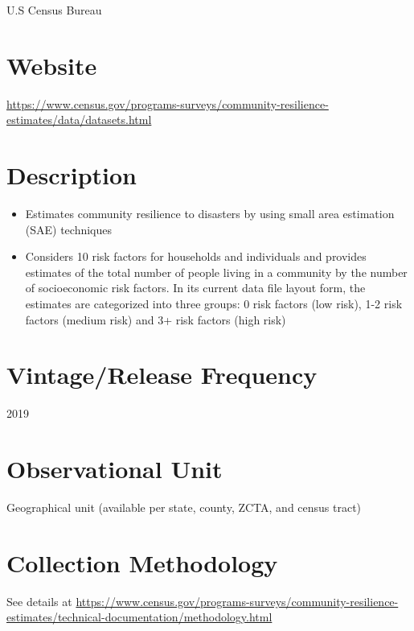 \documentclass[
]{book}
\providecommand{\tightlist}{%
  \setlength{\itemsep}{0pt}\setlength{\parskip}{0pt}}
\begin{document}
U.S Census Bureau

\hypertarget{website-17}{%
\section{Website}\label{website-17}}

\url{https://www.census.gov/programs-surveys/community-resilience-estimates/data/datasets.html}

\hypertarget{description-17}{%
\section{Description}\label{description-17}}

\begin{itemize}
\tightlist
\item
  Estimates community resilience to disasters by using small area estimation (SAE) techniques
\item
  Considers 10 risk factors for households and individuals and provides estimates of the total number of people living in a community by the number of socioeconomic risk factors. In its current data file layout form, the estimates are categorized into three
  groups: 0 risk factors (low risk), 1-2 risk factors (medium risk) and 3+ risk factors (high risk)
\end{itemize}

\hypertarget{vintagerelease-frequency-17}{%
\section{Vintage/Release Frequency}\label{vintagerelease-frequency-17}}

2019

\hypertarget{observational-unit-17}{%
\section{Observational Unit}\label{observational-unit-17}}

Geographical unit (available per state, county, ZCTA, and census tract)

\hypertarget{collection-methodology-17}{%
\section{Collection Methodology}\label{collection-methodology-17}}

See details at \url{https://www.census.gov/programs-surveys/community-resilience-estimates/technical-documentation/methodology.html}
\end{document}
